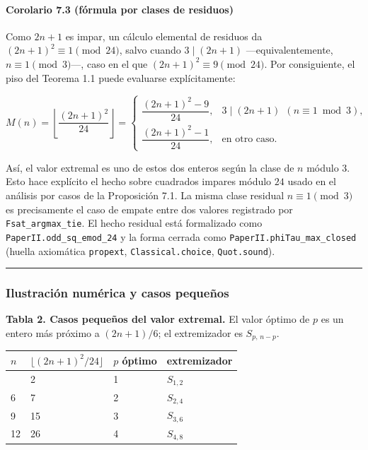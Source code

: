 \documentclass[
  spanish,
  11pt,
  a4paper,
]{article}
\newcounter{none} %
\begin{document}
\paragraph{Corolario 7.3 (fórmula por clases de residuos)}\label{corolario-7.3-fuxf3rmula-por-clases-de-residuos}

Como \(2n+1\) es impar, un cálculo elemental de residuos da \((2n+1)^2\equiv1\pmod{24}\), salvo cuando \(3\mid(2n+1)\) ---equivalentemente, \(n\equiv1\pmod3\)---, caso en el que \((2n+1)^2\equiv9\pmod{24}\). Por consiguiente, el piso del Teorema 1.1 puede evaluarse explícitamente:

\[
M(n)=\left\lfloor\frac{(2n+1)^2}{24}\right\rfloor
=
\begin{cases}
\dfrac{(2n+1)^2-9}{24}, & 3\mid(2n+1)\ \ (n\equiv1\bmod3),\\[3mm]
\dfrac{(2n+1)^2-1}{24}, & \text{en otro caso.}
\end{cases}
\]

Así, el valor extremal es uno de estos dos enteros según la clase de \(n\) módulo \(3\). Esto hace explícito el hecho sobre cuadrados impares módulo \(24\) usado en el análisis por casos de la Proposición 7.1. La misma clase residual \(n\equiv1\pmod3\) es precisamente el caso de empate entre dos valores registrado por \texttt{Fsat\_argmax\_tie}. El hecho residual está formalizado como \texttt{PaperII.odd\_sq\_emod\_24} y la forma cerrada como \texttt{PaperII.phiTau\_max\_closed} (huella axiomática \texttt{propext}, \texttt{Classical.choice}, \texttt{Quot.sound}).

\begin{center}\rule{0.5\linewidth}{0.5pt}\end{center}

\subsubsection{Ilustración numérica y casos pequeños}\label{ilustraciuxf3n-numuxe9rica-y-casos-pequeuxf1os}

\textbf{Tabla 2. Casos pequeños del valor extremal.} El valor óptimo de \(p\) es un entero más próximo a \((2n+1)/6\); el extremizador es \(S_{p,\,n-p}\).

{\def\LTcaptype{none} %
\begin{longtable}[]{@{}llll@{}}
\toprule\noalign{}
\(n\) & \(\lfloor(2n+1)^2/24\rfloor\) & \(p\) óptimo & extremizador \\
\midrule\noalign{}
\endhead
\bottomrule\noalign{}
\endlastfoot
3 & 2 & 1 & \(S_{1,2}\) \\
6 & 7 & 2 & \(S_{2,4}\) \\
9 & 15 & 3 & \(S_{3,6}\) \\
12 & 26 & 4 & \(S_{4,8}\) \\
\end{longtable}
}
\end{document}
